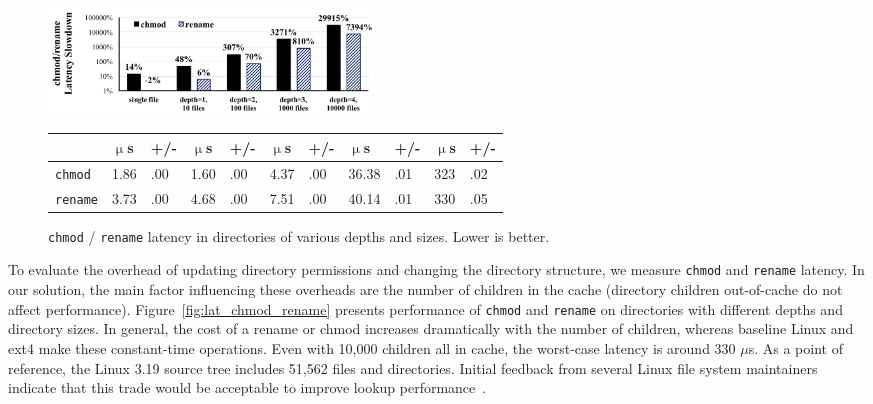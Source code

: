 \begin{figure}[t!]
\scriptsize
\raggedleft
\includegraphics[width=3.4in]{dcache/plots/lm_chmod_rename.pdf}
{\setlength{\tabcolsep}{3pt}
\begin{tabular}{|l|R{0.24in}R{0.13in}|R{0.24in}R{0.13in}|R{0.24in}R{0.13in}|R{0.24in}R{0.13in}|R{0.24in}R{0.13in}|}
\hline
 & $\upmu$s & +/- & $\upmu$s & +/- & $\upmu$s & +/- & $\upmu$s & +/- & $\upmu$s & +/- \\
\hline
{\tt chmod}  & 1.86 & .00 & 1.60 & .00 & 4.37 & .00 & 36.38 & .01 & 323 & .02 \\
\hline
{\tt rename} & 3.73 & .00 & 4.68 & .00 & 7.51 & .00 & 40.14 & .01 & 330 & .05 \\
\hline
\end{tabular}}
\caption{{\tt chmod} / {\tt rename} latency in directories of various depths and sizes. Lower is better.}
\label{fig:dcache:lat-chmod-rename}
\end{figure}

To evaluate the overhead of updating directory permissions and changing the directory structure,
we measure {\tt chmod} and {\tt rename} latency.
In our solution, the main factor influencing these overheads are the number of children
in the cache (directory children out-of-cache do not affect performance).
Figure~\ref{fig:lat_chmod_rename} presents
performance of {\tt chmod} and {\tt rename}  on directories with different depths and directory sizes.
In general, the cost of a rename or chmod increases dramatically with the number of children,
whereas baseline Linux and ext4 make these constant-time operations.
Even with 10,000 children all in cache, the worst-case latency is around 330 $\mu$s.
As a point of reference, the Linux 3.19 source tree includes 51,562 files and directories.
Initial feedback from several Linux file system maintainers indicate that this trade would be acceptable
to improve lookup performance~\citep{linux-forum}.

